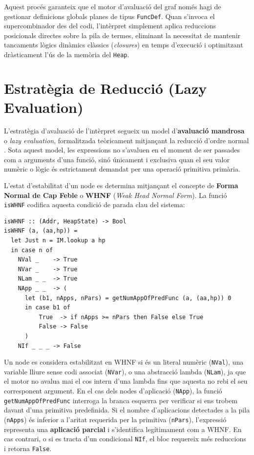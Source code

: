 Aquest procés garanteix que el motor d'avaluació del graf només hagi de gestionar definicions globals planes de tipus \texttt{FuncDef}. Quan s'invoca el supercombinador des del codi, l'intèrpret simplement aplica reduccions posicionals directes sobre la pila de termes, eliminant la necessitat de mantenir tancaments lògics dinàmics clàssics (\textit{closures}) en temps d'execució i optimitzant dràsticament l'ús de la memòria del \texttt{Heap}.

\section{Estratègia de Reducció (Lazy Evaluation)}

L'estratègia d'avaluació de l'intèrpret segueix un model d'\textbf{avaluació mandrosa} o \textit{lazy evaluation}, formalitzada teòricament mitjançant la reducció d'ordre normal \cite{peyton1987implementation}. Sota aquest model, les expressions no s'avaluen en el moment de ser passades com a arguments d'una funció, sinó únicament i exclusiva quan el seu valor numèric o lògic és estrictament demandat per una operació primitiva primària.

L'estat d'estabilitat d'un node es determina mitjançant el concepte de \textbf{Forma Normal de Cap Feble} o \textbf{WHNF} (\textit{Weak Head Normal Form}). La funció \texttt{isWHNF} codifica aquesta condició de parada clau del sistema:

\begin{lstlisting}[style=haskellstyle, caption=Funció de control de la Forma Normal de Cap Feble]
isWHNF :: (Addr, HeapState) -> Bool
isWHNF (a, (aa,hp)) =
  let Just n = IM.lookup a hp
  in case n of
    NVal _    -> True
    NVar _    -> True
    NLam _ _  -> True
    NApp _ _  -> (
      let (b1, nApps, nPars) = getNumAppOfPredFunc (a, (aa,hp)) 0
      in case b1 of
          True  -> if nApps >= nPars then False else True
          False -> False
      )
    NIf _ _ _ -> False
\end{lstlisting}

Un node es considera estabilitzat en WHNF si és un literal numèric (\texttt{NVal}), una variable lliure sense codi associat (\texttt{NVar}), o una abstracció lambda (\texttt{NLam}), ja que el motor no avalua mai el cos intern d'una lambda fins que aquesta no rebi el seu corresponent argument. En el cas dels nodes d'aplicació (\texttt{NApp}), la funció \texttt{getNumAppOfPredFunc} interroga la branca esquerra per verificar si ens trobem davant d'una primitiva predefinida. Si el nombre d'aplicacions detectades a la pila (\texttt{nApps}) és inferior a l'aritat requerida per la primitiva (\texttt{nPars}), l'expressió representa una \textbf{aplicació parcial} i s'identifica legítimament com a WHNF. En cas contrari, o si es tracta d'un condicional \texttt{NIf}, el bloc requereix més reduccions i retorna \texttt{False}.

